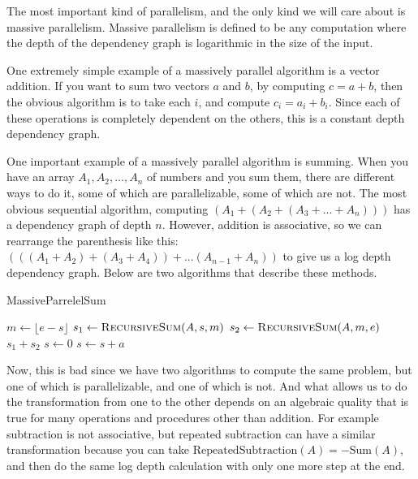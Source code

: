 \documentclass[12pt,twoside]{reedthesis}
\newcommand{\floor}[1]{\lfloor #1 \rfloor}
\begin{document}
		The most important kind of parallelism, and the only kind we will care about is massive parallelism. Massive parallelism is defined to be any computation where the depth of the dependency graph is logarithmic in the size of the input.

		One extremely simple example of a massively parallel algorithm is a vector addition. If you want to sum two vectors $a$ and $b$, by computing $c = a+b$, then the obvious algorithm is to take each $i$, and compute $c_i = a_i + b_i$. Since each of these operations is completely dependent on the others, this is a constant depth dependency graph.

		One important example of a massively parallel algorithm is summing. When you have an array $A_1,A_2,...,A_n$ of numbers and you sum them, there are different ways to do it, some of which are parallelizable, some of which are not. The most obvious sequential algorithm, computing $(A_1+(A_2+(A_3+...+A_n)))$ has a dependency graph of depth $n$. However, addition is associative, so we can rearrange the parenthesis like this: $(((A_1+A_2)+(A_3+A_4))+...(A_{n-1}+A_n))$ to give us a log depth dependency graph. Below are two algorithms that describe these methods.

		\begin{algorithm}
			\caption{MassiveParrelelSum}\label{parellelsum}
			\begin{algorithmic}[1]
					\EndIf
					\State $m \gets \floor{e-s}$
					\State $s_1 \gets \textsc{RecursiveSum}(A,s,m)$
					\State $s_2 \gets \textsc{RecursiveSum}(A,m,e)$
					\State \Return $s_1+s_2$
				\EndFunction
					\State $s \gets 0$
						\State $s \gets s + a$
					\EndFor
				\EndFunction
			\end{algorithmic}
		\end{algorithm}

		Now, this is bad since we have two algorithms to compute the same problem, but one of which is parallelizable, and one of which is not. And what allows us to do the transformation from one to the other depends on an algebraic quality that is true for many operations and procedures other than addition. For example subtraction is not associative, but repeated subtraction can have a similar transformation because you can take $\text{RepeatedSubtraction}(A) = -\text{Sum}(A)$, and then do the same log depth calculation with only one more step at the end.
\end{document}
